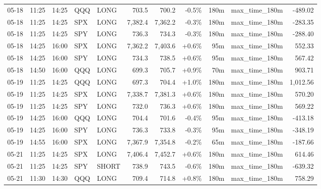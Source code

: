 \documentclass[11pt,a4paper,twoside]{article}
\begin{document}
\begin{center}
\begin{longtable}{>{\color{txtmain}}l l l l l r r r r >{\color{txtmain}}l r}
05-18 & 11:25 & 14:25 & QQQ & LONG & 703.5 & 700.2 & \textcolor{lossred}{-0.5\%} & 180m & max\_time\_180m & \textcolor{lossred}{-489.02} \\
05-18 & 11:25 & 14:25 & SPX & LONG & 7,382.4 & 7,362.2 & \textcolor{lossred}{-0.3\%} & 180m & max\_time\_180m & \textcolor{lossred}{-283.35} \\
05-18 & 11:25 & 14:25 & SPY & LONG & 736.3 & 734.3 & \textcolor{lossred}{-0.3\%} & 180m & max\_time\_180m & \textcolor{lossred}{-288.40} \\
05-18 & 14:25 & 16:00 & SPX & LONG & 7,362.2 & 7,403.6 & \textcolor{wingreen}{+0.6\%} & 95m & max\_time\_180m & \textcolor{wingreen}{552.33} \\
05-18 & 14:25 & 16:00 & SPY & LONG & 734.3 & 738.5 & \textcolor{wingreen}{+0.6\%} & 95m & max\_time\_180m & \textcolor{wingreen}{567.42} \\
05-18 & 14:50 & 16:00 & QQQ & LONG & 699.3 & 705.7 & \textcolor{wingreen}{+0.9\%} & 70m & max\_time\_180m & \textcolor{wingreen}{903.71} \\
05-19 & 11:25 & 14:25 & QQQ & LONG & 697.3 & 704.4 & \textcolor{wingreen}{+1.0\%} & 180m & max\_time\_180m & \textcolor{wingreen}{1,012.56} \\
05-19 & 11:25 & 14:25 & SPX & LONG & 7,338.7 & 7,381.3 & \textcolor{wingreen}{+0.6\%} & 180m & max\_time\_180m & \textcolor{wingreen}{570.20} \\
05-19 & 11:25 & 14:25 & SPY & LONG & 732.0 & 736.3 & \textcolor{wingreen}{+0.6\%} & 180m & max\_time\_180m & \textcolor{wingreen}{569.22} \\
05-19 & 14:25 & 16:00 & QQQ & LONG & 704.4 & 701.6 & \textcolor{lossred}{-0.4\%} & 95m & max\_time\_180m & \textcolor{lossred}{-413.18} \\
05-19 & 14:25 & 16:00 & SPY & LONG & 736.3 & 733.8 & \textcolor{lossred}{-0.3\%} & 95m & max\_time\_180m & \textcolor{lossred}{-348.19} \\
05-19 & 14:55 & 16:00 & SPX & LONG & 7,367.9 & 7,354.8 & \textcolor{lossred}{-0.2\%} & 65m & max\_time\_180m & \textcolor{lossred}{-187.66} \\
05-21 & 11:25 & 14:25 & SPX & LONG & 7,406.4 & 7,452.7 & \textcolor{wingreen}{+0.6\%} & 180m & max\_time\_180m & \textcolor{wingreen}{614.46} \\
05-21 & 11:25 & 14:25 & SPY & SHORT & 738.9 & 743.5 & \textcolor{lossred}{-0.6\%} & 180m & max\_time\_180m & \textcolor{lossred}{-639.32} \\
05-21 & 11:30 & 14:30 & QQQ & LONG & 709.4 & 714.8 & \textcolor{wingreen}{+0.8\%} & 180m & max\_time\_180m & \textcolor{wingreen}{758.29} \\

\end{longtable}
\end{center}
\end{document}
